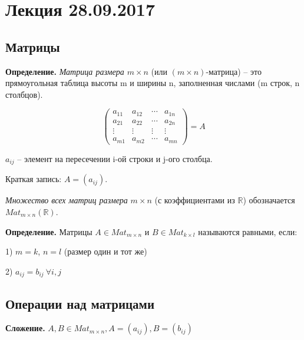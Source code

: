 \section{Лекция 28.09.2017}

\subsection{Матрицы}

\vspace{\baselineskip}
\textbf{Определение.} \textit{Матрица размера $m \times n$} (или $(m \times n)$-матрица) -- это прямоугольная таблица высоты m и ширины n, заполненная числами (m строк, n столбцов).

\begin{equation*}
	\begin{pmatrix}
		a_{11} & a_{12} & \cdots & a_{1n} \\
		a_{21} & a_{22} & \cdots & a_{2n} \\
       \vdots & \vdots & \vdots& \vdots \\ 
       a_{m1} & a_{m2} & \cdots & a_{mn}
	\end{pmatrix}
    = A
\end{equation*}

\vspace{\baselineskip}
$a_{ij}$ -- элемент на пересечении i-ой строки и j-ого столбца.

Краткая запись: $A = (a_{ij})$.

\vspace{\baselineskip}
\textit{Множество всех матриц размера} $m \times n$ (с коэффициентами из $\mathbb{R}$) обозначается $Mat_{m\times n}(\mathbb{R})$. 

\vspace{\baselineskip}
\textbf{Определение.} Матрицы $A \in Mat_{m\times n}$ и $B \in Mat_{k\times l}$ называются равными, если:

1) $m = k$, $n = l$ (размер один и тот же)

2) $a_{ij} = b_{ij} \ \forall i, j$

\vspace{\baselineskip}
\subsection{Операции над матрицами}

\vspace{\baselineskip}
\textbf{Сложение.} $A, B \in Mat_{m\times n}, A = (a_{ij}), B = (b_{ij})$

